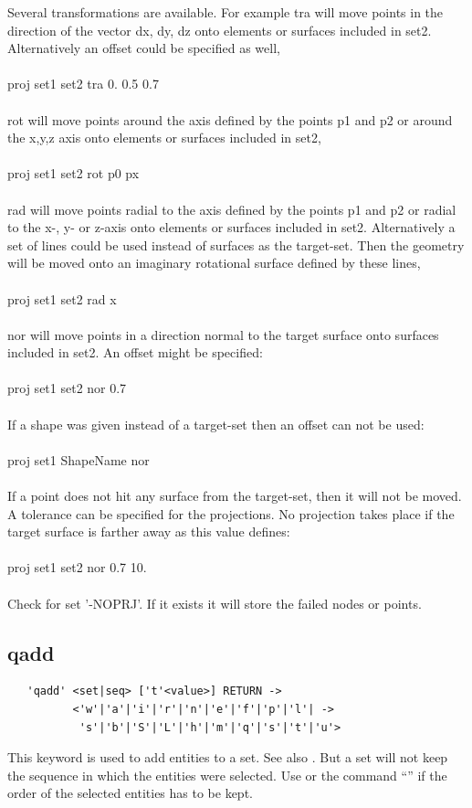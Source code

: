 \documentclass{article}
\begin{document}
Several transformations are available. For example tra will move points in the direction of the vector dx, dy, dz onto elements or surfaces included in set2. Alternatively an offset could be specified as well,\\\\
proj set1 set2 tra 0. 0.5 0.7  \\\\
rot will move points around the axis defined by the points p1 and p2 or around the x,y,z axis onto elements or surfaces included in set2,\\\\
proj set1 set2 rot p0 px \\\\
rad will move points radial to the axis defined by the points p1 and p2 or radial to the x-, y- or z-axis onto elements or surfaces included in set2. Alternatively a set of lines could be used instead of surfaces as the target-set. Then the geometry will be moved onto an imaginary rotational surface defined by these lines,\\\\
proj set1 set2 rad x \\\\
nor will move points in a direction normal to the target surface onto surfaces included in set2. An offset might be specified:\\\\
proj set1 set2 nor 0.7 \\\\ 
If a shape was given instead of a target-set then an offset can not be used:\\\\
proj set1 ShapeName nor \\\\ 
If a point does not hit any surface from the target-set, then it will not be moved. A tolerance can be specified for the projections. No projection takes place if the target surface is farther away as this value defines:\\\\
proj set1 set2 nor 0.7 10. \\\\

Check for set '-NOPRJ'. If it exists it will store the failed nodes or points.

\subsection{\label{qadd}qadd}
\begin{verbatim}
   'qadd' <set|seq> ['t'<value>] RETURN ->
          <'w'|'a'|'i'|'r'|'n'|'e'|'f'|'p'|'l'| ->
           's'|'b'|'S'|'L'|'h'|'m'|'q'|'s'|'t'|'u'> 
\end{verbatim}
This keyword is used to add entities to a set. See also . But a set will not keep the sequence in which the entities were selected. Use  or the command ``'' if the order of the selected entities has to be kept. 
\end{document}
